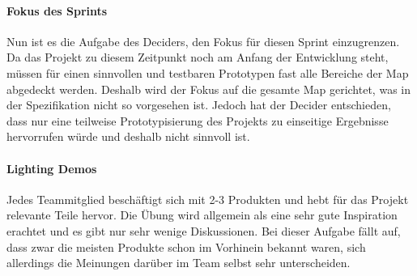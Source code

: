 
\paragraph{Fokus des Sprints}
Nun ist es die Aufgabe des Deciders, den Fokus für diesen Sprint einzugrenzen. Da das Projekt zu diesem Zeitpunkt noch am Anfang der Entwicklung steht, müssen für einen sinnvollen und testbaren Prototypen fast alle Bereiche der Map abgedeckt werden. Deshalb wird der Fokus auf die gesamte Map gerichtet, was in der Spezifikation nicht so vorgesehen ist. Jedoch hat der Decider entschieden, dass nur eine teilweise Prototypisierung des Projekts zu einseitige Ergebnisse hervorrufen würde und deshalb nicht sinnvoll ist.

\paragraph{Lighting Demos}
%
Jedes Teammitglied beschäftigt sich mit 2-3 Produkten und hebt für das Projekt relevante Teile hervor. Die Übung wird allgemein als eine sehr gute Inspiration erachtet und es gibt nur sehr wenige Diskussionen. 
Bei dieser Aufgabe fällt auf, dass zwar die meisten Produkte schon im Vorhinein bekannt waren, sich allerdings die Meinungen darüber im Team selbst sehr unterscheiden.

